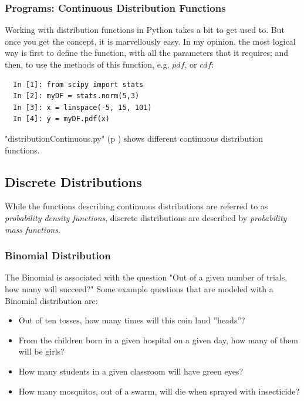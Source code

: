 \subsubsection{Programs: Continuous Distribution Functions}

Working with distribution functions in Python takes a bit to get used to. But once you get the concept, it is marvellously easy. In my opinion, the most logical way is first to define the function, with all the parameters that it requires; and then, to use the methods of this function, e.g. $pdf$, or $cdf$:

\begin{lstlisting}
  In [1]: from scipy import stats
  In [2]: myDF = stats.norm(5,3)
  In [3]: x = linspace(-5, 15, 101)
  In [4]: y = myDF.pdf(x)
\end{lstlisting}

\PyImg "distributionContinuous.py" (p \pageref{py:continuous}) shows different continuous distribution functions.

\subsection{Discrete Distributions}

While the functions describing continuous distributions are referred to as \emph{probability density functions}, discrete distributions are described by \emph{probability mass functions}.

\subsubsection{Binomial Distribution}
The Binomial is associated with the question "Out of a given number of trials, how many will succeed?" Some example questions that are modeled with a Binomial distribution are:
\begin{itemize}
  \item Out of ten tosses, how many times will this coin land ''heads''?
  \item From the children born in a given hospital on a given day, how many of them will be girls?
  \item How many students in a given classroom will have green eyes?
  \item How many mosquitos, out of a swarm, will die when sprayed with insecticide?
\end{itemize}


